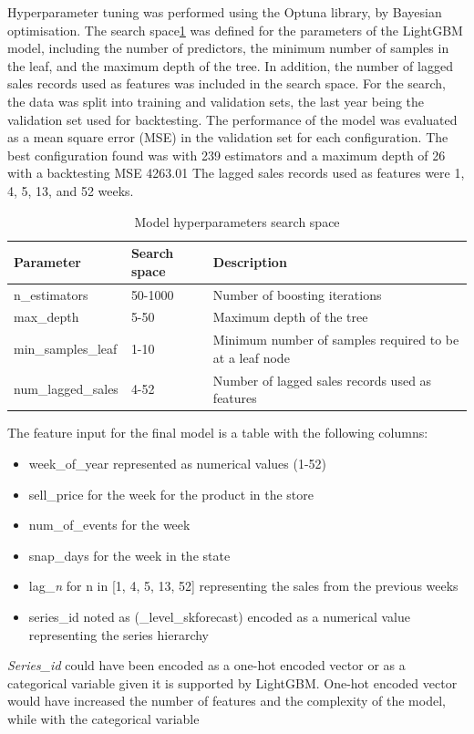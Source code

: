Hyperparameter tuning was performed using the Optuna library\cite{optuna_2019}, by Bayesian optimisation.
The search space\ref{tab:hyperparam_search_space} was defined for the parameters of the LightGBM model, including the number of predictors, the minimum number of samples in the leaf, and the maximum depth of the tree.
In addition, the number of lagged sales records used as features was included in the search space.
For the search, the data was split into training and validation sets, the last year being the validation set used for backtesting.
The performance of the model was evaluated as a mean square error (MSE) in the validation set for each configuration.
The best configuration found was with 239 estimators and a maximum depth of 26 with a backtesting MSE 4263.01
The lagged sales records used as features were 1, 4, 5, 13, and 52 weeks.
\begin{table}
    \centering
    \begin{tabular}{|l|l|l|}
        \hline
        Parameter          & Search space & Description                                             \\
        \hline
        n\_estimators      & 50-1000      & Number of boosting iterations                           \\
        max\_depth         & 5-50         & Maximum depth of the tree                               \\
        min\_samples\_leaf & 1-10         & Minimum number of samples required to be at a leaf node \\
        num\_lagged\_sales & 4-52         & Number of lagged sales records used as features         \\
        \hline
    \end{tabular}
    \caption{Model hyperparameters search space}
    \label{tab:hyperparam_search_space}
\end{table}

The feature input for the final model is a table with the following columns:
\begin{itemize}
    \item week\_of\_year represented as numerical values (1-52)
    \item sell\_price for the week for the product in the store
    \item num\_of\_events for the week
    \item snap\_days for the week in the state
    \item lag\_\emph{n} for n in [1, 4, 5, 13, 52] representing the sales from the previous weeks
    \item series\_id noted as (\_level\_skforecast) encoded as a numerical value representing the series hierarchy
\end{itemize}
\emph{Series\_id} could have been encoded as a one-hot encoded vector or as a categorical variable given it is supported by LightGBM.
One-hot encoded vector would have increased the number of features and the complexity of the model,
while with the categorical variable


